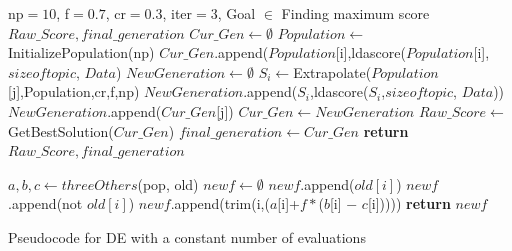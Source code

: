 \documentclass[10pt,conference]{IEEEtran}
\theoremstyle{break}
\begin{document}
\renewcommand{\algorithmicrequire}{\textbf{Input:}}
\renewcommand{\algorithmicensure}{\textbf{Output:}}
\begin{algorithm}[!t]


 
  
    \begin{algorithmic}[1]
    \Require np$=10$, f$=0.7$, cr$=0.3$, iter$=3$, Goal $\in$ Finding maximum score
    \Ensure $Raw\_Score, final\_generation$
        \State  $Cur\_Gen \leftarrow \emptyset$
        \State $Population \leftarrow $InitializePopulation(np)
            \State $Cur\_Gen$.append($Population$[i],ldascore($Population$[i], $\mathit{size of topic}$, $Data$)
        \EndFor
            \State $NewGeneration \leftarrow \emptyset$
                \State $S_i \leftarrow $Extrapolate($Population$[j],Population,cr,f,np)
                    \State $NewGeneration$.append($S_i$,ldascore($S_i$,$\mathit{size of topic}$, $Data$))
                \Else
                    \State $NewGeneration$.append($Cur\_Gen$[j])
                \EndIf
            \State  $Cur\_Gen \leftarrow NewGeneration$
            \EndFor
        \EndFor
        \State $Raw\_Score \leftarrow$ GetBestSolution($Cur\_Gen$)
        \State  $final\_generation \leftarrow Cur\_Gen$
        \State \textbf{return} $Raw\_Score, final\_generation$
    \EndFunction

        \State $a,b,c \leftarrow threeOthers$(pop, old)
        \State $newf \leftarrow \emptyset$
                \State $newf$.append($old[i]$)
            \Else
                    \State $newf$.append(not $old[i]$)
                \Else 
                    \State $newf$.append(trim(i,($a$[i]+$f\ast$($b$[i] $-$ $c$[i]))))
                \EndIf
            \EndIf
        \EndFor
        \State \textbf{return} $newf$ 
    \EndFunction
    \caption{Pseudocode for DE with a constant number of evaluations}
    \end{algorithmic}
\end{algorithm}
\end{document}
